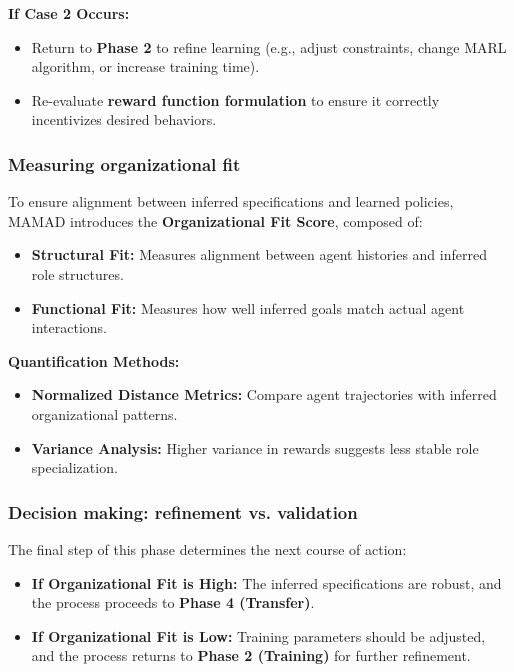 \documentclass[pdflatex,sn-mathphys-num]{sn-jnl}%
\theoremstyle{thmstyleone}%
\theoremstyle{thmstyletwo}%
\theoremstyle{thmstylethree}%
\begin{document}
\noindent \textbf{If Case 2 Occurs:}
\begin{itemize}
    \item Return to \textbf{Phase 2} to refine learning (e.g., adjust constraints, change MARL algorithm, or increase training time).
    \item Re-evaluate \textbf{reward function formulation} to ensure it correctly incentivizes desired behaviors.
\end{itemize}

\subsubsection{Measuring organizational fit}
To ensure alignment between inferred specifications and learned policies, MAMAD introduces the \textbf{Organizational Fit Score}, composed of:

\begin{itemize}
    \item \textbf{Structural Fit:} Measures alignment between agent histories and inferred role structures.
    \item \textbf{Functional Fit:} Measures how well inferred goals match actual agent interactions.
\end{itemize}

\noindent \textbf{Quantification Methods:}
\begin{itemize}
    \item \textbf{Normalized Distance Metrics:} Compare agent trajectories with inferred organizational patterns.
    \item \textbf{Variance Analysis:} Higher variance in rewards suggests less stable role specialization.
\end{itemize}

\subsubsection{Decision making: refinement vs. validation}
The final step of this phase determines the next course of action:

\begin{itemize}
    \item \textbf{If Organizational Fit is High:} The inferred specifications are robust, and the process proceeds to \textbf{Phase 4 (Transfer)}.
    \item \textbf{If Organizational Fit is Low:} Training parameters should be adjusted, and the process returns to \textbf{Phase 2 (Training)} for further refinement.
\end{itemize}
\end{document}
